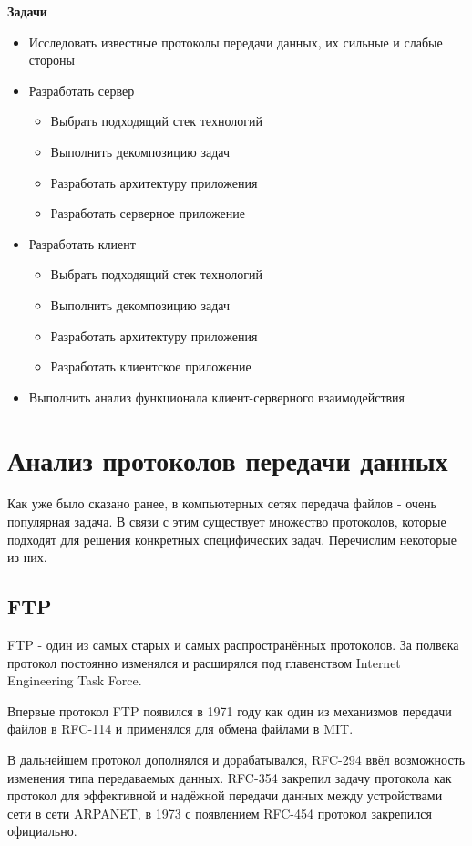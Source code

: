 \documentclass[a4paper,14pt]{extarticle}
\begin{document}
\textbf{Задачи}\\
\begin{itemize}
  \item Исследовать известные протоколы передачи данных, их сильные и слабые стороны
  \item Разработать сервер
  \begin{itemize}
    \item Выбрать подходящий стек технологий
    \item Выполнить декомпозицию задач
    \item Разработать архитектуру приложения
    \item Разработать серверное приложение
  \end{itemize}
  \item Разработать клиент
  \begin{itemize}
    \item Выбрать подходящий стек технологий
    \item Выполнить декомпозицию задач
    \item Разработать архитектуру приложения
    \item Разработать клиентское приложение
  \end{itemize}
  \item Выполнить анализ функционала клиент-серверного взаимодействия
\end{itemize}

\newpage

\section{Анализ протоколов передачи данных}
Как уже было сказано ранее, в компьютерных сетях передача файлов - очень
популярная задача. В связи с этим существует множество протоколов, которые 
подходят для решения конкретных специфических задач. Перечислим некоторые из них.

\subsection{FTP}
FTP - один из самых старых и самых распространённых протоколов. За полвека 
протокол постоянно изменялся и расширялся под главенством Internet Engineering Task Force.

Впервые протокол FTP появился в 1971 году как один из механизмов передачи
файлов в RFC-114 и применялся для обмена файлами в MIT.

В дальнейшем протокол дополнялся и дорабатывался, RFC-294 ввёл возможность
изменения типа передаваемых данных. RFC-354 закрепил задачу протокола как
протокол для эффективной и надёжной передачи данных между устройствами сети в сети ARPANET, 
в 1973 с появлением RFC-454 протокол закрепился официально.
\end{document}
